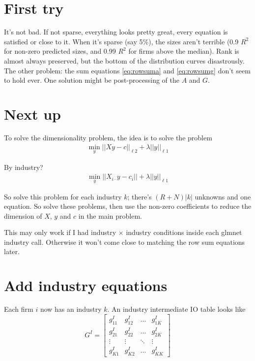 \documentclass[11pt]{article}
\begin{document}
\section{First try}

It's not bad. If not sparse, everything looks pretty great, every equation is satisfied or close to it. When it's sparse (say 5\%), the sizes aren't terrible (0.9 $R^2$ for non-zero predicted sizes, and 0.99 $R^2$ for firms above the median). Rank is almost always preserved, but the bottom of the distribution curves disastrously. The other problem: the sum equations \eqref{eq:rowsuma} and \eqref{eq:rowsumg} don't seem to hold ever.  One solution might be post-processing of the $A$ and $G$.

\section{Next up}

To solve the dimensionality problem, the idea is to solve the problem
\begin{gather}
\min_y || X y - c||_{\ell 2} + \lambda || y ||_{\ell 1}
\end{gather}

By industry?
\begin{gather}
\min_{y} || X_{i \cdot} y - c_i || + \lambda || y ||_{\ell 1} 
\end{gather}

So solve this problem for each industry $k$; there's $(R+N) | k | $ unknowns and one equation. So solve these problems, then use the non-zero coefficients to reduce the dimension of $X$, $y$ and $c$ in the main problem.

This may only work if I had industry $\times$ industry conditions inside each glmnet industry call. Otherwise it won't come close to matching the row sum equations later.


\section{Add industry equations}

Each firm $i$ now has an industry $k$. An industry intermediate IO table looks like
\[
G^I =
\begin{bmatrix}
    g^I_{11} & g^I_{12} &\dots  & g^I_{1K}  \\
    g^I_{21} & g^I_{22}  &\dots  & g^I_{2K} \\
    \vdots & \vdots & \ddots & \vdots \\
    g^I_{K1} & g^I_{K2} & \dots  &  g^I_{KK}
\end{bmatrix}
\]
\end{document}
